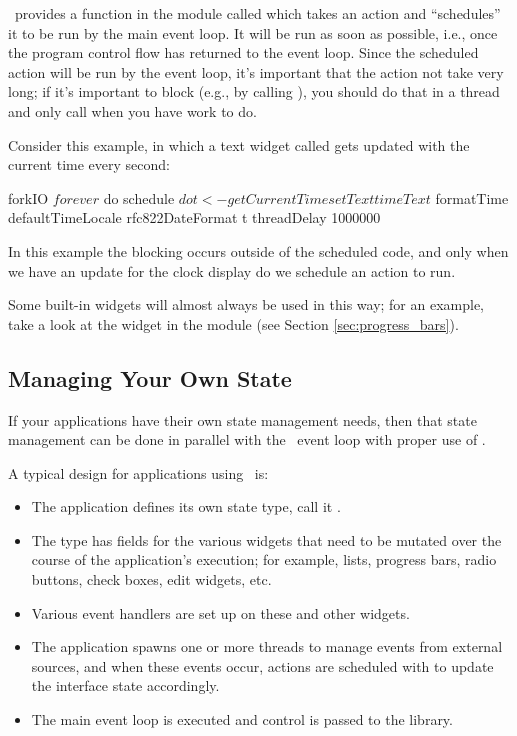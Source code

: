 \vtyui\ provides a function in the  module called
 which takes an  action and ``schedules'' it to be
run by the main event loop.  It will be run as soon as possible, i.e.,
once the program control flow has returned to the event loop.  Since
the scheduled action will be run by the event loop, it's important
that the action not take very long; if it's important to block (e.g.,
by calling ), you should do that in
a thread and only call  when you have work to do.

Consider this example, in which a text widget called 
gets updated with the current time every second:

\begin{haskellcode}
 forkIO $
   forever $ do
     schedule $ do
       t <- getCurrentTime
       setText timeText $
         formatTime defaultTimeLocale rfc822DateFormat t
     threadDelay 1000000
\end{haskellcode}

In this example the blocking occurs outside of the scheduled code, and
only when we have an update for the clock display do we schedule an
action to run.

Some built-in widgets will almost always be used in this way; for an
example, take a look at the  widget in the
 module (see Section \ref{sec:progress_bars}).

\subsection{Managing Your Own State}

If your applications have their own state management needs, then that
state management can be done in parallel with the \vtyui\ event loop
with proper use of .

A typical design for applications using \vtyui\ is:

\begin{itemize}
\item The application defines its own state type, call it
  .
\item The  type has fields for the various widgets that
  need to be mutated over the course of the application's execution;
  for example, lists, progress bars, radio buttons, check boxes, edit
  widgets, etc.
\item Various event handlers are set up on these and other widgets.
\item The application spawns one or more threads to manage events from
  external sources, and when these events occur, actions are scheduled
  with  to update the interface state accordingly.
\item The main event loop is executed and control is passed to the
  library.
\end{itemize}
